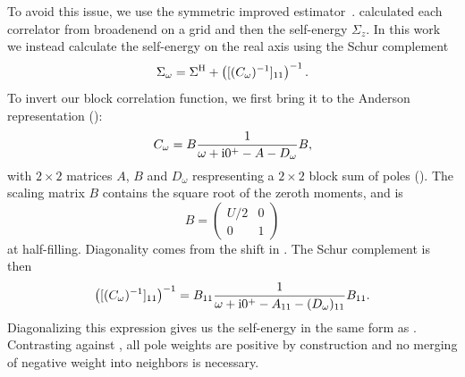 To avoid this issue,
we use the symmetric improved estimator~\cite{Kugler2022}.
\citeauthor{Kugler2022} calculated each correlator from 
broadenend on a grid and then the self-energy $\Sigma_z$.
In this work we instead calculate the self-energy on the real axis
using the Schur complement~\cite{Schur1917, Zacinskis2025}
\begin{equation}
    \Sigma_\omega = \Sigma^{\mathrm{H}} + \left([(C_\omega)^{-1}]_{11}\right)^{-1}.
    \label{eq:self-energy-schur}
\end{equation}
To invert our block correlation function, we first bring it to
the Anderson representation ():
\begin{equation}
    C_\omega = B\frac{1}{\omega + \mathrm{i}0^+ - A - D_\omega}B,
\end{equation}
with $2\times2$ matrices $A$, $B$
and $D_\omega$ respresenting a $2\times2$ block sum of poles ().
The scaling matrix $B$ contains the square root of the zeroth moments,
and is
\begin{equation}
    B
    =
    \begin{pmatrix}
        U/2 & 0 \\
        0   & 1
    \end{pmatrix}
    \label{eq:amplitudes-half-filling}
\end{equation}
at half-filling.
Diagonality comes from the shift in .
The Schur complement is then
\begin{equation}
    \left([(C_\omega)^{-1}]_{11}\right)^{-1}
    =
    B_{11} \frac{1}{\omega + \mathrm{i}0^+ - A_{11} - (D_\omega)_{11}} B_{11}.
\end{equation}
Diagonalizing this expression gives us the self-energy in the same form as
.
Contrasting against ,
all pole weights are positive by construction
and no merging of negative weight into neighbors is necessary.

